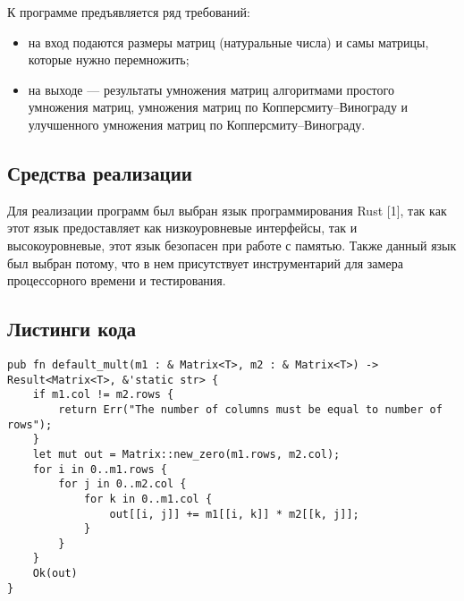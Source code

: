 К программе предъявляется ряд требований:
\begin{itemize}
    \item на вход подаются размеры матриц (натуральные числа) и самы матрицы, которые нужно перемножить;
    \item на выходе — результаты умножения матриц алгоритмами простого умножения матриц, умножения матриц по Копперсмиту–Винограду и улучшенного умножения матриц по Копперсмиту–Винограду.
\end{itemize}

\subsection{Средства реализации}


Для реализации программ был выбран язык программирования Rust [1], так как этот язык предоставляет как низкоуровневые интерфейсы, так и высокоуровневые, этот язык безопасен при работе с памятью. Также данный язык был выбран потому, что в нем присутствует инструментарий для замера процессорного времени и тестирования.

\subsection{Листинги кода}

\begin{lstlisting}[caption=Алгоритм простого умножения матриц, label=list:canon, language={}]
pub fn default_mult(m1 : & Matrix<T>, m2 : & Matrix<T>) -> Result<Matrix<T>, &'static str> {
    if m1.col != m2.rows {
        return Err("The number of columns must be equal to number of rows");
    }
    let mut out = Matrix::new_zero(m1.rows, m2.col);
    for i in 0..m1.rows {
        for j in 0..m2.col {
            for k in 0..m1.col {
                out[[i, j]] += m1[[i, k]] * m2[[k, j]];
            }
        }
    }
    Ok(out)
}
\end{lstlisting}

